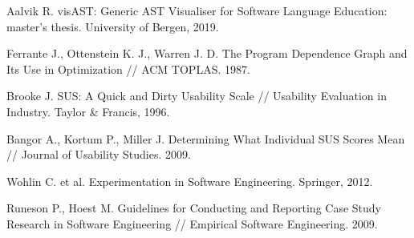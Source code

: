 ﻿\documentclass[14pt,a4paper]{extarticle}
\begin{document}
\begin{enumerate}[label={[\arabic*]},leftmargin=*,itemsep=0pt,topsep=0pt]
\item Aalvik R. visAST: Generic AST Visualiser for Software Language Education: master's thesis. University of Bergen, 2019.
\item Ferrante J., Ottenstein K. J., Warren J. D. The Program Dependence Graph and Its Use in Optimization // ACM TOPLAS. 1987.
\item Brooke J. SUS: A Quick and Dirty Usability Scale // Usability Evaluation in Industry. Taylor \& Francis, 1996.
\item Bangor A., Kortum P., Miller J. Determining What Individual SUS Scores Mean // Journal of Usability Studies. 2009.
\item Wohlin C. et al. Experimentation in Software Engineering. Springer, 2012.
\item Runeson P., Hoest M. Guidelines for Conducting and Reporting Case Study Research in Software Engineering // Empirical Software Engineering. 2009.
\end{enumerate}
\end{document}
